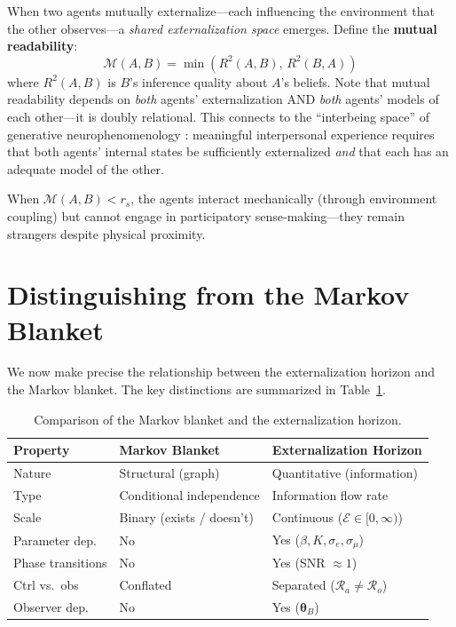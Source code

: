 \documentclass[runningheads]{llncs}
\begin{document}
When two agents mutually externalize---each influencing the environment that the other observes---a \emph{shared externalization space} emerges. Define the \textbf{mutual readability}:
\begin{equation}
    \mathcal{M}(A, B) = \min\left(R^2(A, B), \, R^2(B, A)\right)
    \label{eq:mutual_readability}
\end{equation}
where $R^2(A, B)$ is $B$'s inference quality about $A$'s beliefs. Note that mutual readability depends on \emph{both} agents' externalization AND \emph{both} agents' models of each other---it is doubly relational. This connects to the ``interbeing space'' of generative neurophenomenology \cite{monnier2025generative}: meaningful interpersonal experience requires that both agents' internal states be sufficiently externalized \emph{and} that each has an adequate model of the other.

When $\mathcal{M}(A, B) < r_s$, the agents interact mechanically (through environment coupling) but cannot engage in participatory sense-making---they remain strangers despite physical proximity.

\section{Distinguishing from the Markov Blanket}
\label{sec:vs_mb}

We now make precise the relationship between the externalization horizon and the Markov blanket. The key distinctions are summarized in Table~\ref{tab:comparison}.

\begin{table}[htbp]
\centering
\caption{Comparison of the Markov blanket and the externalization horizon.}
\label{tab:comparison}
\begin{tabular}{@{}lll@{}}
\toprule
\textbf{Property} & \textbf{Markov Blanket} & \textbf{Externalization Horizon} \\
\midrule
Nature & Structural (graph) & Quantitative (information) \\
Type & Conditional independence & Information flow rate \\
Scale & Binary (exists / doesn't) & Continuous ($\mathcal{E} \in [0, \infty)$) \\
Parameter dep. & No & Yes ($\beta, K, \sigma_e, \sigma_\mu$) \\
Phase transitions & No & Yes (SNR $\approx 1$) \\
Ctrl vs.\ obs & Conflated & Separated ($\mathcal{R}_a \neq \mathcal{R}_o$) \\
Observer dep. & No & Yes ($\boldsymbol{\theta}_B$) \\
\bottomrule
\end{tabular}
\end{table}
\end{document}
